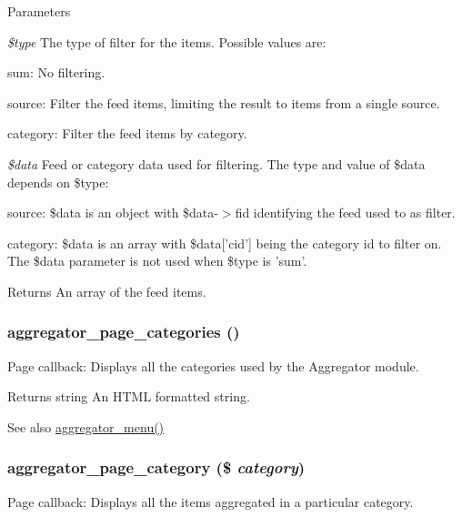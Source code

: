 \begin{DoxyParams}{Parameters}
\item[{\em \$type}]The type of filter for the items. Possible values are:
\begin{DoxyItemize}
\item sum: No filtering.
\item source: Filter the feed items, limiting the result to items from a single source.
\item category: Filter the feed items by category. 
\end{DoxyItemize}\item[{\em \$data}]Feed or category data used for filtering. The type and value of \$data depends on \$type:
\begin{DoxyItemize}
\item source: \$data is an object with \$data-\/$>$fid identifying the feed used to as filter.
\item category: \$data is an array with \$data\mbox{[}'cid'\mbox{]} being the category id to filter on. The \$data parameter is not used when \$type is 'sum'.
\end{DoxyItemize}\end{DoxyParams}
\begin{DoxyReturn}{Returns}
An array of the feed items. 
\end{DoxyReturn}
\hypertarget{aggregator_8pages_8inc_a180a110c19ebe4eeaacaa61aff7b42e5}{
\subsubsection[{aggregator\_\-page\_\-categories}]{\setlength{\rightskip}{0pt plus 5cm}aggregator\_\-page\_\-categories ()}}
\label{aggregator_8pages_8inc_a180a110c19ebe4eeaacaa61aff7b42e5}
Page callback: Displays all the categories used by the Aggregator module.

\begin{DoxyReturn}{Returns}
string An HTML formatted string.
\end{DoxyReturn}
\begin{DoxySeeAlso}{See also}
\hyperlink{aggregator_8module_a18d55253ab5538426a4fc6d20b672dda}{aggregator\_\-menu()} 
\end{DoxySeeAlso}
\hypertarget{aggregator_8pages_8inc_aaf7794d54e6d62be94efc636f9a39a4b}{
\subsubsection[{aggregator\_\-page\_\-category}]{\setlength{\rightskip}{0pt plus 5cm}aggregator\_\-page\_\-category (\$ {\em category})}}
\label{aggregator_8pages_8inc_aaf7794d54e6d62be94efc636f9a39a4b}
Page callback: Displays all the items aggregated in a particular category.


